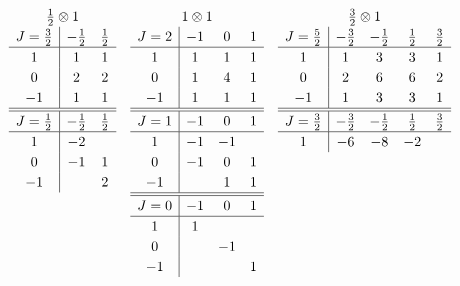 \documentclass[amsmath,amssymb,prc,aps]{revtex4-2}
\begin{document}
\begin{gather}
  \renewcommand{\arraystretch}{1.2}
  \begin{array}[t]{c|cc}
  \multicolumn{3}{c}{\tfrac12\otimes1} \\
  J=\tfrac32 & -\tfrac12 & \tfrac12 \\ \hline
   1         &  1        &  1       \\
   0         &  2        &  2       \\
  -1         &  1        &  1
  \\\hline\hline
  J=\tfrac12 & -\tfrac12 & \tfrac12 \\ \hline
   1         & -2        &          \\
   0         & -1        &  1       \\
  -1         &           &  2
  \end{array}
  \quad
  \begin{array}[t]{c|ccc}
  \multicolumn{4}{c}{1\otimes1} \\
  J=2 & -1 &  0 & 1 \\ \hline
   1  &  1 &  1 & 1 \\
   0  &  1 &  4 & 1 \\
  -1  &  1 &  1 & 1
  \\\hline\hline
  J=1 & -1 &  0 & 1 \\ \hline
   1  & -1 & -1 &   \\
   0  & -1 &  0 & 1 \\
  -1  &    &  1 & 1
  \\\hline\hline
  J=0 & -1 &  0 & 1 \\ \hline
   1  &  1 &    &   \\
   0  &    & -1 &   \\
  -1  &    &    & 1
  \end{array}
  \quad
  \begin{array}[t]{c|cccc}
  \multicolumn{5}{c}{\tfrac32\otimes1} \\
  J=\tfrac52 & -\tfrac32 & -\tfrac12 & \tfrac12 & \tfrac32 \\ \hline
   1         &  1        &  3        &  3       &  1       \\
   0         &  2        &  6        &  6       &  2       \\
  -1         &  1        &  3        &  3       &  1
  \\\hline\hline
  J=\tfrac32 & -\tfrac32 & -\tfrac12 & \tfrac12 & \tfrac32 \\ \hline
   1         & -6        & -8        & -2       &          \\

\end{array}
\end{gather}
\end{document}
